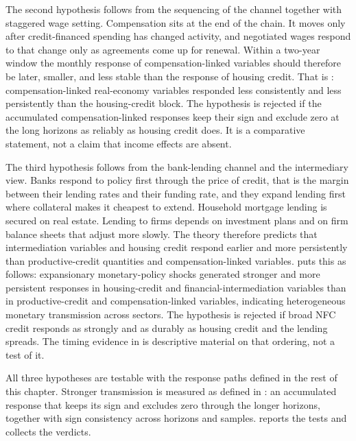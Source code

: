 The second hypothesis follows from the sequencing of the channel together with staggered wage setting. Compensation sits at the end of the chain. It moves only after credit-financed spending has changed activity, and negotiated wages respond to that change only as agreements come up for renewal. Within a two-year window the monthly response of compensation-linked variables should therefore be later, smaller, and less stable than the response of housing credit. That is : compensation-linked real-economy variables responded less consistently and less persistently than the housing-credit block. The hypothesis is rejected if the accumulated compensation-linked responses keep their sign and exclude zero at the long horizons as reliably as housing credit does. It is a comparative statement, not a claim that income effects are absent.

The third hypothesis follows from the bank-lending channel and the intermediary view. Banks respond to policy first through the price of credit, that is the margin between their lending rates and their funding rate, and they expand lending first where collateral makes it cheapest to extend. Household mortgage lending is secured on real estate. Lending to firms depends on investment plans and on firm balance sheets that adjust more slowly. The theory therefore predicts that intermediation variables and housing credit respond earlier and more persistently than productive-credit quantities and compensation-linked variables.  puts this as follows: expansionary monetary-policy shocks generated stronger and more persistent responses in housing-credit and financial-intermediation variables than in productive-credit and compensation-linked variables, indicating heterogeneous monetary transmission across sectors. The hypothesis is rejected if broad NFC credit responds as strongly and as durably as housing credit and the lending spreads. The timing evidence in  is descriptive material on that ordering, not a test of it.

All three hypotheses are testable with the response paths defined in the rest of this chapter. Stronger transmission is measured as defined in : an accumulated response that keeps its sign and excludes zero through the longer horizons, together with sign consistency across horizons and samples.  reports the tests and  collects the verdicts.

